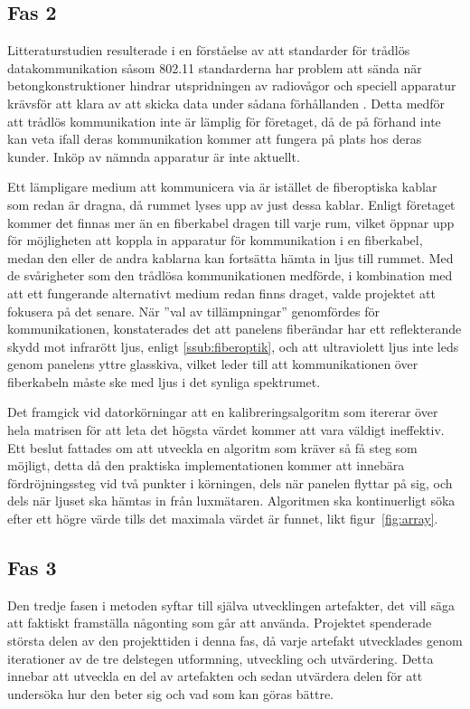     \subsection{Fas 2} %
    \label{sub:steg_2}
        Litteraturstudien resulterade i en förståelse av att standarder för trådlös datakommunikation såsom 802.11 standarderna har problem att sända när betongkonstruktioner hindrar utspridningen av radiovågor och speciell apparatur krävsför att klara av att skicka data under sådana förhållanden \cite{11n}. Detta medför att trådlös kommunikation inte är lämplig för företaget, då de på förhand inte kan veta ifall deras kommunikation kommer att fungera på plats hos deras kunder. Inköp av nämnda apparatur är inte aktuellt. \bigskip

        Ett lämpligare medium att kommunicera via är istället de fiberoptiska kablar som redan är dragna, då rummet lyses upp av just dessa kablar. Enligt företaget kommer det finnas mer än en fiberkabel dragen till varje rum, vilket öppnar upp för möjligheten att koppla in apparatur för kommunikation i en fiberkabel, medan den eller de andra kablarna kan fortsätta hämta in ljus till rummet. Med de svårigheter som den trådlösa kommunikationen medförde, i kombination med att ett fungerande alternativt medium redan finns draget, valde projektet att fokusera på det senare. När ''val av tillämpningar'' genomfördes för kommunikationen, konstaterades det att panelens fiberändar har ett reflekterande skydd mot infrarött ljus, enligt \ref{ssub:fiberoptik}, och att ultraviolett ljus inte leds genom panelens yttre glasskiva, vilket leder till att kommunikationen över fiberkabeln måste ske med ljus i det synliga spektrumet. \bigskip

        Det framgick vid datorkörningar att en kalibreringsalgoritm som itererar över hela matrisen för att leta det högsta värdet kommer att vara väldigt ineffektiv. Ett beslut fattades om att utveckla en algoritm som kräver så få steg som möjligt, detta då den praktiska implementationen kommer att innebära fördröjningssteg vid två punkter i körningen, dels när panelen flyttar på sig, och dels när ljuset ska hämtas in från luxmätaren. Algoritmen ska kontinuerligt söka efter ett högre värde tills det maximala värdet är funnet, likt figur~\ref{fig:array}.


    \subsection{Fas 3} %
    \label{sub:steg_3}
        Den tredje fasen i metoden syftar till själva utvecklingen artefakter, det vill säga att faktiskt framställa någonting som går att använda. Projektet spenderade största delen av den projekttiden i denna fas, då varje artefakt utvecklades genom iterationer av de tre delstegen utformning, utveckling och utvärdering. Detta innebar att utveckla en del av artefakten och sedan utvärdera delen för att undersöka hur den beter sig och vad som kan göras bättre.


